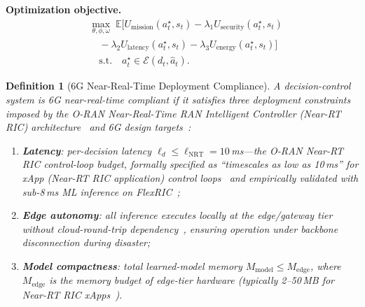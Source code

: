 \documentclass[10pt,journal,compsoc]{IEEEtran}
\newtheorem{definition}{Definition}
\begin{document}
\noindent\textbf{Optimization objective.}
\begin{align*}
&\max_{\theta,\phi,\omega}\;
\mathbb{E}\!\Big[
U_{\mathrm{mission}}(a_t^\star, s_t)
-\lambda_1 U_{\mathrm{security}}(a_t^\star, s_t)\\
&\quad -\lambda_2 U_{\mathrm{latency}}(a_t^\star, s_t)
-\lambda_3 U_{\mathrm{energy}}(a_t^\star, s_t)
\Big]\\
&\quad\text{s.t.}\quad
a_t^\star \in \mathcal{E}(d_t, \hat{a}_t).
\end{align*}

\begin{definition}[6G Near-Real-Time Deployment Compliance]
\label{def:6g_compliance}
A decision-control system is \emph{6G near-real-time compliant} if it satisfies three deployment constraints imposed by the O-RAN Near-Real-Time RAN Intelligent Controller (Near-RT RIC) architecture~\cite{oran_official_architecture,oran_ngrg_2024} and 6G design targets~\cite{saad2020vision6g,letaief2019roadmap6g}:
\begin{enumerate}
    \item \textbf{Latency}: per-decision latency $\ell_d \le \ell_{\mathrm{NRT}} = 10$\,ms---the O-RAN Near-RT RIC control-loop budget, formally specified as ``timescales as low as 10\,ms'' for xApp (Near-RT RIC application) control loops~\cite{oran_ngrg_2024} and empirically validated with sub-8\,ms ML inference on FlexRIC~\cite{dasilva2024xapp};
    \item \textbf{Edge autonomy}: all inference executes locally at the edge/gateway tier without cloud-round-trip dependency~\cite{raftopoulos2024drl,demichelis2025edge}, ensuring operation under backbone disconnection during disaster;
    \item \textbf{Model compactness}: total learned-model memory $M_{\mathrm{model}} \le M_{\mathrm{edge}}$, where $M_{\mathrm{edge}}$ is the memory budget of edge-tier hardware (typically 2--50\,MB for Near-RT RIC xApps~\cite{oran_official_architecture,dasilva2024xapp}).
\end{enumerate}
\end{definition}
\end{document}
